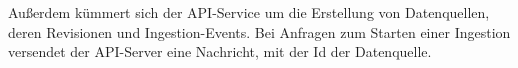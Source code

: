 \begin{table}[ht]
\begin{tabularx}{\linewidth}{lX}
  \end{tabularx}
  \label{tab:enpoints}
\end{table}

Außerdem kümmert sich der API-Service um die Erstellung von Datenquellen, deren Revisionen und Ingestion-Events.
Bei Anfragen zum Starten einer Ingestion versendet der API-Server eine Nachricht, mit der Id der Datenquelle.